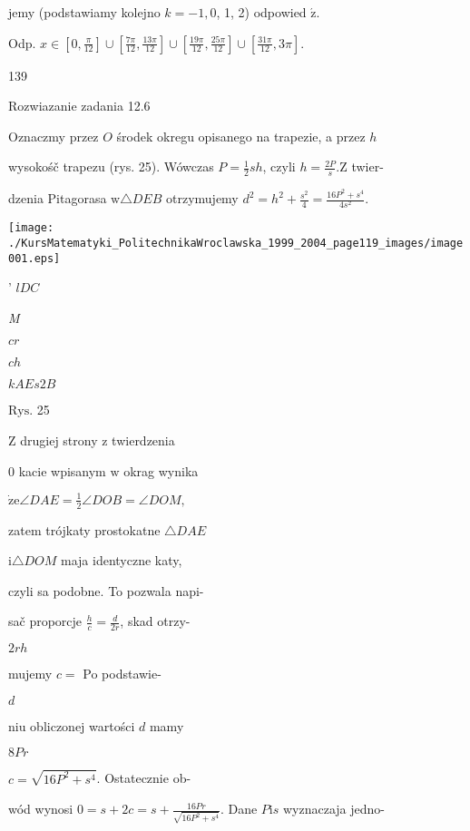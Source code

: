 \documentclass[a4paper,12pt]{article}
\begin{document}
jemy (podstawiamy kolejno $k=-1, 0$, 1, 2) odpowied $\acute{\mathrm{z}}.$

Odp. $ x\in [0,\displaystyle \frac{\pi}{12}]\cup [\displaystyle \frac{7\pi}{12},\frac{13\pi}{12}]\cup [\displaystyle \frac{19\pi}{12},\frac{25\pi}{12}]\cup [\displaystyle \frac{31\pi}{12},3\pi].$





139

Rozwiazanie zadania 12.6

Oznaczmy przez $O$ środek okregu opisanego na trapezie, a przez $h$

wysokośč trapezu (rys. 25). Wówczas $P= \displaystyle \frac{1}{2}sh$, czyli $h= \displaystyle \frac{2P}{s}. \mathrm{Z}$ twier-

dzenia Pitagorasa $\mathrm{w} \triangle DEB$ otrzymujemy $d^{2}=h^{2}+\displaystyle \frac{s^{2}}{4}=\frac{16P^{2}+s^{4}}{4s^{2}}.$
\begin{center}
\texttt{[image: ./KursMatematyki\_PolitechnikaWroclawska\_1999\_2004\_page119\_images/image001.eps]}
\end{center}
' $l D C$

{\it M}

$c r$

$c h$

$kA E s 2 B$

$\mathrm{R}\mathrm{y}\mathrm{s}$. 25

Z drugiej strony $\mathrm{z}$ twierdzenia

$0$ kacie wpisanym $\mathrm{w}$ okrag wynika

$\dot{\mathrm{z}}\mathrm{e} \angle DAE = \displaystyle \frac{1}{2}\angle DOB = \angle DOM,$

zatem trójkaty prostokatne $\triangle DAE$

$\mathrm{i} \triangle DOM$ maja identyczne katy,

czyli sa podobne. To pozwala napi-

sač proporcje $\displaystyle \frac{h}{c}= \displaystyle \frac{d}{2r}$, skad otrzy-

$2rh$

mujemy $c =$ Po podstawie-

$d$

niu obliczonej wartości $d$ mamy

$8Pr$

$c= \sqrt{16P^{2}+s^{4}}$. Ostatecznie ob-

wód wynosi $0=s+2c=s+\displaystyle \frac{16Pr}{\sqrt{16P^{2}+s^{4}}}$. Dane $P\mathrm{i}s$ wyznaczaja jedno-
\end{document}
